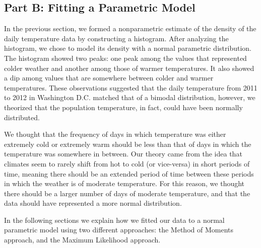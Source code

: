 \documentclass[11pt]{article}
\begin{document}
\subsection{Part B: Fitting a Parametric Model}
\label{subsec:3b}
In the previous section, we formed a nonparametric estimate of the density of the daily temperature data by constructing a histogram. After analyzing the histogram, we chose to model its density with a normal parametric distribution. The histogram showed two peaks: one peak among the values that represented colder weather and another among those of warmer temperatures. It also showed a dip among values that are somewhere between colder and warmer temperatures. These observations suggested that the daily temperature from 2011 to 2012 in Washington D.C. matched that of a bimodal distribution, however, we theorized that the population temperature, in fact, could have been normally distributed.  

We thought that the frequency of days in which temperature was either extremely cold or extremely warm should be less than that of days in which the temperature was somewhere in between. Our theory came from the idea that climates seem to rarely shift from hot to cold (or vice-versa) in short periods of time, meaning there should be an extended period of time between these periods in which the weather is of moderate temperature. For this reason, we thought there should be a larger number of days of moderate temperature, and that the data should have represented a more normal distribution. 

In the following sections we explain how we fitted our data to a normal parametric model using two different approaches: the Method of Moments approach, and the Maximum Likelihood approach. 
\end{document}
